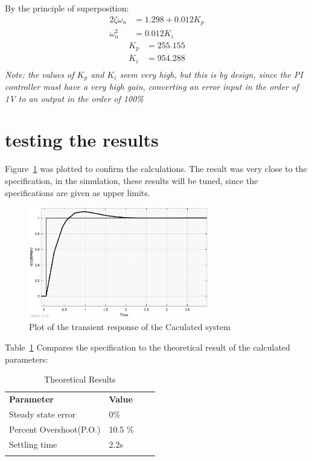 By the principle of superposition:
\begin{align}
2\zeta\omega_n &= 1.298 + 0.012K_p \\
\omega_n^2 &= 0.012K_i 
\end{align}
\begin{align}
	\label{eq:}
	K_p &= 255.155\\
	K_i &= 954.288\\
\end{align}
\emph{Note: the values of $K_p$ and $K_i$ seem very high, but this is by design, since the PI controller must have a very high gain, converting an error input in the order of 1V to an output in the order of 100\% }
\section{testing the results}
Figure~\ref{fig:theoplot} was plotted to confirm the calculations. The result was very close to the specification, in the simulation, these results will be tuned, since the specifications are given as upper limits.

\begin{figure}[h]
		\includegraphics[clip,width=0.7\textwidth]{gfx/calc_plot}%
		\caption{Plot of the transient response of the Caculated system}
\label{fig:theoplot}
\end{figure}


Table~\ref{tbl:theospec} Compares the specification to the theoretical result of the calculated parameters:

\begin{table}[h]
\centering
\caption{Theoretical Results}
\label{tbl:theospec}
\begin{tabular}{llll}
\cline{1-2}
\multicolumn{1}{|l|}{\textbf{Parameter}}      & \multicolumn{1}{l|}{\textbf{Value}} &  &  \\ \cline{1-2}
\multicolumn{1}{|l|}{Steady state error}    & \multicolumn{1}{l|}{0\%}                   &  &  \\ \cline{1-2}
\multicolumn{1}{|l|}{Percent Overshoot(P.O.)} & \multicolumn{1}{l|}{10.5 \%}                       &  &  \\ \cline{1-2}
\multicolumn{1}{|l|}{Settling time} & \multicolumn{1}{l|}{2.2s}                       &  &  \\ \cline{1-2}
                                              &                                             &  & 
\end{tabular}

\end{table}


